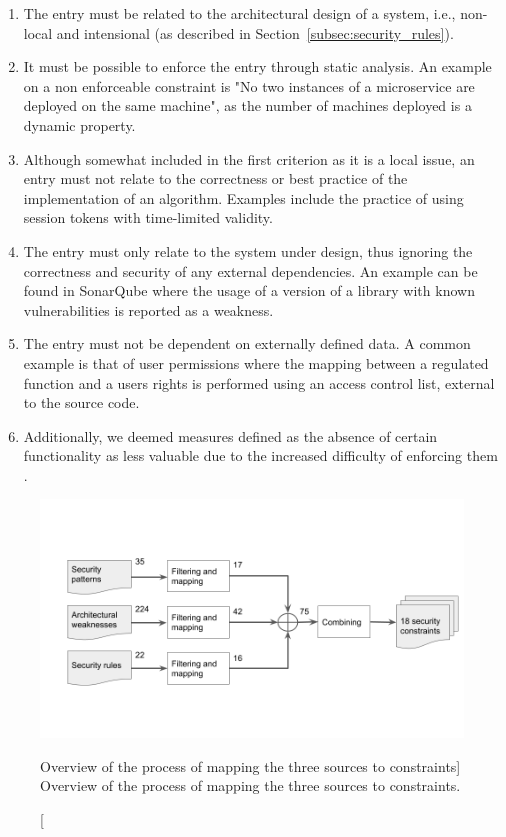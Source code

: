 \begin{enumerate}
    \item The entry must be related to the architectural design of a system, i.e., non-local and intensional (as described in Section~\ref{subsec:security_rules}). \label{criterion_1}
    \item It must be possible to enforce the entry through static analysis. An example on a non enforceable constraint is "No two instances of a microservice are deployed on the same machine", as the number of machines deployed is a dynamic property. \label{criterion_2}
    \item Although somewhat included in the first criterion as it is a local issue, an entry must not relate to the correctness or best practice of the implementation of an algorithm. Examples include the practice of using session tokens with time-limited validity. \label{criterion_3}
    \item The entry must only relate to the system under design, thus ignoring the correctness and security of any external dependencies. An example can be found in SonarQube where the usage of a version of a library with known vulnerabilities is reported as a weakness. \label{criterion_4}
    \item The entry must not be dependent on externally defined data. A common example is that of user permissions where the mapping between a regulated function and a users rights is performed using an access control list, external to the source code. \label{criterion_5}
    \item Additionally, we deemed measures defined as the absence of certain functionality as less valuable due to the increased difficulty of enforcing them \cite{haley_security_2008}.
\end{enumerate}

\begin{figure}
    \centering
    \includegraphics[width=\textwidth]{figure/Half-time presentation.png}
    \caption
        [Overview of the process of mapping the three sources to constraints]
        {Overview of the process of mapping the three sources to constraints.}
    \label{fig:mapping_process}
\end{figure}

